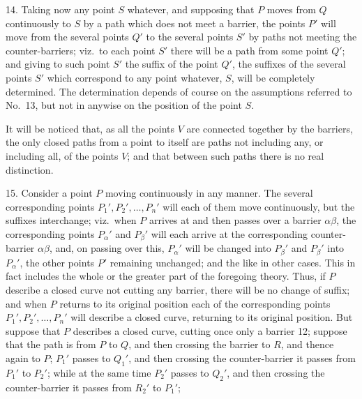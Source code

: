 \documentclass[11pt,a4paper]{article}
\begin{document}
\medskip

14. Taking now any point $S$ whatever, and supposing that $P$ moves from $Q$ continuously to $S$ by a path which does not meet a barrier, the points $P'$ will move from the several points $Q'$ to the several points $S'$ by paths not meeting the counter-barriers; viz.\ to each point $S'$ there will be a path from some point $Q'$; and giving to such point $S'$ the suffix of the point $Q'$, the suffixes of the several points $S'$ which correspond to any point whatever, $S$, will be completely determined. The determination depends of course on the assumptions referred to No.~13, but not in anywise on the position of the point $S$.

\medskip

It will be noticed that, as all the points $V$ are connected together by the barriers, the only closed paths from a point to itself are paths not including any, or including all, of the points $V$; and that between such paths there is no real distinction.

\medskip

15. Consider a point $P$ moving continuously in any manner. The several corresponding points $P_{1}', P_{2}', \ldots, P_{n}'$ will each of them move continuously, but the suffixes interchange; viz.\ when $P$ arrives at and then passes over a barrier $\alpha\beta$, the corresponding points $P_{\alpha}'$ and $P_{\beta}'$ will each arrive at the corresponding counter-barrier $\alpha\beta$, and, on passing over this, $P_{\alpha}'$ will be changed into $P_{\beta}'$ and $P_{\beta}'$ into $P_{\alpha}'$, the other points $P'$ remaining unchanged; and the like in other cases. This in fact includes the whole or the greater part of the foregoing theory. Thus, if $P$ describe a closed curve not cutting any barrier, there will be no change of suffix; and when $P$ returns to its original position each of the corresponding points $P_{1}', P_{2}', \ldots, P_{n}'$ will describe a closed curve, returning to its original position. But suppose that $P$ describes a closed curve, cutting once only a barrier 12; suppose that the path is from $P$ to $Q$, and then crossing the barrier to $R$, and thence again to $P$; $P_{1}'$ passes to $Q_{1}'$, and then crossing the counter-barrier it passes from $P_{1}'$ to $P_{2}'$; while at the same time $P_{2}'$ passes to $Q_{2}'$, and then crossing the counter-barrier it passes from $R_{2}'$ to $P_{1}'$;

\newpage

\end{document}
